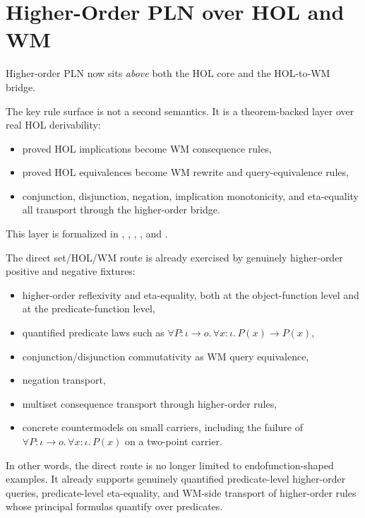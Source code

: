 \documentclass[11pt,openany]{report}
\begin{document}
\section{Higher-Order PLN over HOL and WM}

Higher-order PLN now sits \emph{above} both the HOL core and the HOL-to-WM
bridge.

The key rule surface is not a second semantics.  It is a theorem-backed layer
over real HOL derivability:
\begin{itemize}
\item proved HOL implications become WM consequence rules,
\item proved HOL equivalences become WM rewrite and query-equivalence rules,
\item conjunction, disjunction, negation, implication monotonicity, and
  eta-equality all transport through the higher-order bridge.
\end{itemize}

This layer is formalized in
,
,
,
, and
.

The direct set/HOL/WM route is already exercised by genuinely higher-order
positive and negative fixtures:
\begin{itemize}
\item higher-order reflexivity and eta-equality, both at the object-function
  level and at the predicate-function level,
\item quantified predicate laws such as
  $\forall P:\iota \to o.\,\forall x:\iota.\, P(x)\to P(x)$,
\item conjunction/disjunction commutativity as WM query equivalence,
\item negation transport,
\item multiset consequence transport through higher-order rules,
\item concrete countermodels on small carriers, including the failure of
  $\forall P:\iota \to o.\,\forall x:\iota.\, P(x)$ on a two-point carrier.
\end{itemize}

In other words, the direct route is no longer limited to endofunction-shaped
examples.  It already supports genuinely quantified predicate-level higher-order
queries, predicate-level eta-equality, and WM-side transport of higher-order
rules whose principal formulas quantify over predicates.
\end{document}

